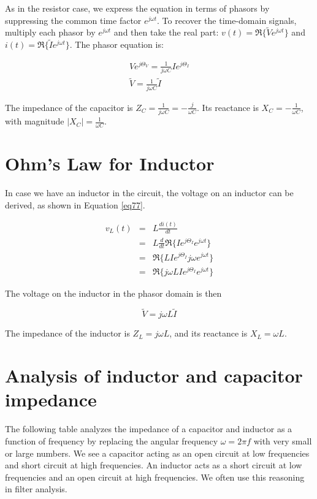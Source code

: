 \documentclass{ximera}
\begin{document}
As in the resistor case, we express the equation in terms of
phasors by suppressing the common time factor $e^{j\omega t}$.
To recover the time-domain signals, multiply each phasor by
$e^{j\omega t}$ and then take the real part:
$v(t)=\Re\{\tilde{V}e^{j\omega t}\}$ and
$i(t)=\Re\{\tilde{I}e^{j\omega t}\}$.
The phasor equation is:




\begin{eqnarray}
 V  e^{j \Theta_{V}}  =   \frac{1}{j \omega C}  I e^{j \Theta_I}  \\
 \tilde{V}  =  \frac{1}{j \omega C}  \tilde{I}
\end{eqnarray}

The impedance of the capacitor is
$Z_C=\frac{1}{j\omega C}=-\frac{j}{\omega C}$.
Its reactance is $X_C=-\frac{1}{\omega C}$,
with magnitude $|X_C|=\frac{1}{\omega C}$.


\section{Ohm's Law for Inductor}


In case we have an inductor in the circuit, the voltage on an inductor can be derived, as shown in Equation \ref{eq77}. 



\begin{eqnarray}
v_L(t)
&=& L\frac{d i(t)}{dt} \nonumber \\
&=& L\frac{d}{dt}\Re\{I e^{j\Theta_I}e^{j\omega t}\}
\nonumber \\
&=& \Re\{LI e^{j\Theta_I}j\omega e^{j\omega t}\}
\nonumber \\
&=& \Re\{j\omega L I e^{j\Theta_I}e^{j\omega t}\}
\label{eq77}
\end{eqnarray}

The voltage on the inductor in the phasor domain is then

\begin{equation}
\tilde{V}=j \omega L \tilde{I}
\end{equation}

The impedance of the inductor is $Z_L=j\omega L$,
and its reactance is $X_L=\omega L$.

\section{Analysis of inductor and capacitor impedance}

The following table analyzes the impedance of a capacitor and inductor as a function of frequency by replacing the angular frequency $\omega= 2 \pi f$ with very small or large numbers. We see a capacitor acting as an open circuit at low frequencies and short circuit at high frequencies. An inductor acts as a short circuit at low frequencies and an open circuit at high frequencies.  We often use this reasoning in filter analysis.
\end{document}
